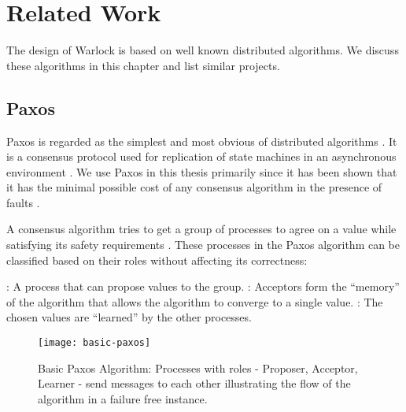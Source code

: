 \chapter{Related Work}
\label{chapter:related.work}

The design of Warlock is based on well known distributed algorithms. We discuss
these algorithms in this chapter and list similar projects.

\section{Paxos}
\label{section:paxos}

Paxos is regarded as the simplest and most obvious of distributed algorithms
\citep{Lamport01}. It is a consensus protocol used for replication of state
machines in an asynchronous environment \citep{Lamport98}. We use Paxos in this
thesis primarily since it has been shown that it has the minimal possible cost
of any consensus algorithm in the presence of faults \citep{KeidarR03}.

A consensus algorithm tries to get a group of processes to agree on a value
while satisfying its safety requirements%
.
These processes in the Paxos algorithm can be classified based on their roles
without affecting its correctness:

\begin{itemize}
  : A process that can propose values to the group.
  : Acceptors form the ``memory'' of the algorithm that allows
  the algorithm to converge to a single value.
  : The chosen values are ``learned'' by the other processes.
\end{itemize}

\begin{figure}
  \texttt{[image: basic-paxos]}
      \caption[Basic Paxos]{%
        Basic Paxos Algorithm: Processes with roles - Proposer, Acceptor,
        Learner - send messages to each other illustrating the flow of the
        algorithm in a failure free instance.}
      \label{figure:basic_paxos}
  \normalcaption
\end{figure}

